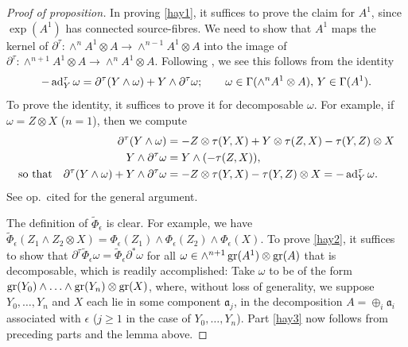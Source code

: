 \documentclass[leqno,12pt]{amsart} %
\begin{document}
\begin{proof}[Proof of proposition]
  In proving \eqref{hay1}, it suffices to prove the claim for $A^1$, since $\exp(A^1)$ has
  connected source-fibres. We need to show that $A^1$ maps the kernel of
  $\partial^\tau \colon \wedge^n A^1 \otimes A \rightarrow \wedge^{n-1}A^1 \otimes A$ into
  the image of
  $\partial^\tau \colon \wedge^{n+1}A^1 \otimes A \rightarrow \wedge^n A^1 \otimes
  A$. Following \cite[p.~263]{Cap_Slovak_09}, we see this follows from the identity
  \begin{equation*}
    -\operatorname{ad}_Y^\tau \omega =
    \partial^\tau(Y \wedge \omega) +
    Y \wedge \partial^\tau \omega;
    \qquad \omega \in \Gamma(\wedge^n A^1 \otimes A),\,Y \in \Gamma(A^1).
  \end{equation*}
  To prove the identity, it suffices to prove it for decomposable $\omega $. For example,
  if $\omega = Z \otimes X$ ($n = 1$), then we compute
  \begin{align*}
    \partial^\tau(Y \wedge \omega) &= - Z \otimes \tau(Y, X) + Y \otimes \tau(Z, X) - \tau(Y,Z) \otimes X\\
    Y \wedge \partial^\tau \omega &= Y \wedge (-\tau(Z, X)),\\
    \text{so that}\quad \partial^\tau (Y \wedge \omega) + Y \wedge \partial^\tau \omega &=
    -Z \otimes \tau(Y,X) - \tau(Y,Z) \otimes X = - \operatorname{ad}^\tau_Y \omega.
  \end{align*}
  See op.~cited for the general argument.

  The definition of $\tilde \Phi_\epsilon$ is clear. For example, we have
  $\tilde \Phi_\epsilon(Z_1 \wedge Z_2 \otimes X) = \Phi_\epsilon(Z_1)\wedge
  \Phi_\epsilon(Z_2) \wedge \Phi_\epsilon(X)$. To prove \eqref{hay2}, it suffices to show
  that
  $\partial^\tau\tilde \Phi_\epsilon \omega = \tilde \Phi_\epsilon \partial^* \omega $ for
  all $\omega \in \wedge^{n+1} \operatorname{\operatorname{gr}}(A^1) \otimes \operatorname{\operatorname{gr}}(A)$ that is decomposable,
  which is readily accomplished: Take $\omega$ to be of the form
  $\operatorname{\operatorname{gr}}(Y_0) \wedge \ldots \wedge \operatorname{\operatorname{gr}}(Y_n) \otimes \operatorname{\operatorname{gr}}(X)$, where, without loss
  of generality, we suppose $Y_0,\ldots,Y_n$ and $X$ each lie in some component
  ${\mathfrak a}_j$, in the decomposition $A=\oplus_i {\mathfrak a}_i$ associated with
  $\epsilon $ ($j\ge 1$ in the case of $Y_0,\ldots,Y_n$). Part \eqref{hay3} now follows
  from preceding parts and the lemma above.
\end{proof}
\end{document}
